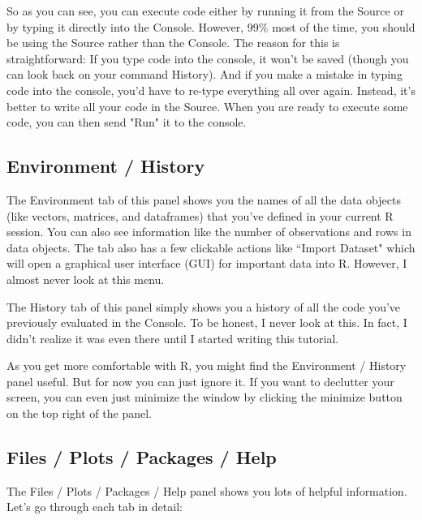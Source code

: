 \documentclass{tufte-book}\usepackage[]{graphicx}\usepackage[]{color}
\begin{document}
So as you can see, you can execute code either by running it from the Source or by typing it directly into the Console. However, 99\% most of the time, you should be using the Source rather than the Console. The reason for this is straightforward: If you type code into the console, it won't be saved (though you can look back on your command History). And if you make a mistake in typing code into the console, you'd have to re-type everything all over again. Instead, it's better to write all your code in the Source. When you are ready to execute some code, you can then send "Run" it to the console.

\subsection{Environment / History}

The Environment tab of this panel shows you the names of all the data objects (like vectors, matrices, and dataframes) that you've defined in your current R session. You can also see information like the number of observations and rows in data objects. The tab also has a few clickable actions like ``Import Dataset" which will open a graphical user interface (GUI) for important data into R. However, I almost never look at this menu.

The History tab of this panel simply shows you a history of all the code you've previously evaluated in the Console. To be honest, I never look at this. In fact, I didn't realize it was even there until I started writing this tutorial.

As you get more comfortable with R, you might find the Environment / History panel useful. But for now you can just ignore it. If you want to declutter your screen, you can even just minimize the window by clicking the minimize button on the top right of the panel.

\subsection{Files / Plots / Packages / Help}

The Files / Plots / Packages / Help panel shows you lots of helpful information. Let's go through each tab in detail:
\end{document}
